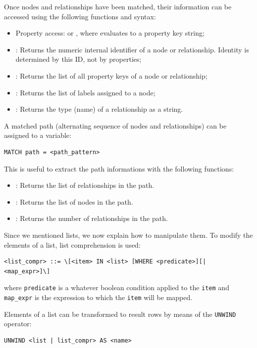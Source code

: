Once nodes and relationships have been matched, their information can be accessed using the following functions and syntax:

\begin{itemize}
    \item Property access:  or , where  evaluates to a property key string;
    \item {}: Returns the numeric internal identifier of a node or relationship. Identity is determined by this ID, not by properties;
    \item {}: Returns the list of all property keys of a node or relationship;
    \item {}: Returns the list of labels assigned to a node;
    \item {}: Returns the type (name) of a relationship as a string.
\end{itemize}

\noindent
A matched path (alternating sequence of nodes and relationships) can be assigned to a variable: 
\begin{lstlisting}
MATCH path = <path_pattern> 
\end{lstlisting}
This is useful to extract the path informations with the following functions:

\begin{itemize}
    \item {}: Returns the list of relationships in the path.
    \item {}: Returns the list of nodes in the path.
    \item {}: Returns the number of relationships in the path.
\end{itemize}

\noindent
Since we mentioned lists, we now explain how to manipulate them.
To modify the elements of a list, list comprehension is used:
\begin{lstlisting}
<list_compr> ::= \[<item> IN <list> [WHERE <predicate>][| <map_expr>]\]
\end{lstlisting}
where \texttt{predicate} is a whatever boolean condition applied to the \texttt{item} and \texttt{map\_expr} is the expression to which the \texttt{item} will be mapped.

Elements of a list can be transformed to result rows by means of the \texttt{UNWIND} operator:   
\begin{lstlisting}
UNWIND <list | list_compr> AS <name>
\end{lstlisting}

